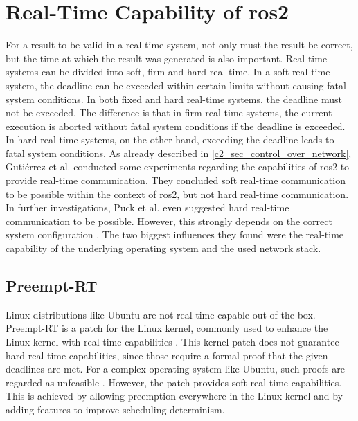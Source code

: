 \section{Real-Time Capability of \gls{ros2}}
For a result to be valid in a real-time system, not only must the result be correct, but the time at which the result was generated is also important. Real-time systems can be divided into soft, firm and hard real-time. In a soft real-time system, the deadline can be exceeded within certain limits without causing fatal system conditions. In both fixed and hard real-time systems, the deadline must not be exceeded. The difference is that in firm real-time systems, the current execution is aborted without fatal system conditions if the deadline is exceeded. In hard real-time systems, on the other hand, exceeding the deadline leads to fatal system conditions.\newline
As already described in \autoref{c2_sec_control_over_network}, Gutiérrez et al. conducted some experiments regarding the capabilities of \gls{ros2} to provide real-time communication. They concluded soft real-time communication to be possible within the context of \gls{ros2}, but not hard real-time communication\cite{gutierrez_towards_2018}. In further investigations, Puck et al. even suggested hard real-time communication to be possible. However, this strongly depends on the correct system configuration \cite{puck_performance_2021}. The two biggest influences they found were the real-time capability of the underlying operating system and the used network stack.

\subsection{Preempt-RT}
Linux distributions like Ubuntu are not real-time capable out of the box. Preempt-RT is a patch for the Linux kernel, commonly used to enhance the Linux kernel with real-time capabilities \cite{noauthor_realtimestart_nodate}. This kernel patch does not guarantee hard real-time capabilities, since those require a formal proof that the given deadlines are met. For a complex operating system like Ubuntu, such proofs are regarded as unfeasible \cite{puck_distributed_2020}. However, the patch provides soft real-time capabilities. This is achieved by allowing preemption everywhere in the Linux kernel and by adding features to improve scheduling determinism.

